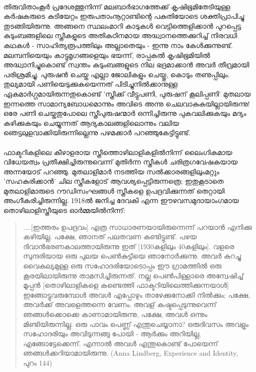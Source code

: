 \paragraph{}തിരുവിതാംകൂർ പ്രദേശത്തുനിന്ന് മലബാർഭാഗത്തേക്ക് കൃഷിഭൂമിതേടിയുള്ള കർഷകരുടെ കുടിയേറ്റം ഇരുപതാംനൂറ്റാണ്ടിന്റെ പകുതിയോടെ ശക്തിപ്രാപിച്ചു തുടങ്ങിയിരുന്നു. അങ്ങനെ സ്ഥലംമാറി കാടുകൾ വെട്ടിത്തെളിക്കാൻ പുറപ്പെട്ട കുടുംബങ്ങളിലെ സ്ത്രീകളുടെ അതികഠിനമായ അദ്ധ്വാനത്തെക്കുറിച്ച് നിരവധി കഥകൾ - സാഹിത്യരൂപത്തിലും അല്ലാതെയും - ഇന്നു നാം കേൾക്കുന്നുണ്ട്. മലമ്പനിയെയും കാട്ടുമൃഗങ്ങളെയും ഭയന്ന്, രാപ്പകൽ കൃഷിഭൂമിയിൽ അദ്ധ്വാനിച്ചുകൊണ്ട് സ്വന്തം കുടുംബങ്ങളുടെ നില ഭദ്രമാക്കാൻ അവർ തീവ്രമായി പരിശ്രമിച്ചു. പുരുഷൻ ചെയ്ത എല്ലാ ജോലികളും ചെയ്തു, കൊടും തണുപ്പിലും. തുല്യമായി പണിയെടുക്കുകയെന്നത് പിടിച്ചുനിൽക്കാനുള്ള ഏകമാർഗ്ഗമായിരുന്നതുകൊണ്ട് 'സ്ത്രീക്ക് വീട്ടുപണി, പുരുഷന് കൂലിപ്പണി' മുതലായ ഇന്നത്തെ സാമാന്യബോധമൊന്നും അവിടെ അന്നു ചെലവാകുകയില്ലായിരുന്നു! ഒരേ പണി ചെയ്തതുപോലെ സ്ത്രീപുരുഷന്മാർ ഒന്നിച്ചിരുന്നു പുകവലിക്കുകയും മദ്യം കഴിക്കുകയും ചെയ്യുന്നത് ആദ്യകാലങ്ങളിലൊന്നും വലിയ ഞെട്ടലുളവാക്കിയിരുന്നില്ലെന്നു പഴമക്കാർ പറഞ്ഞുകേട്ടിട്ടുണ്ട്.

\paragraph{}ഫാക്ടറികളിലെ കീഴാളരായ സ്ത്രീത്തൊഴിലാളികളിൽനിന്ന് ലൈംഗികമായ വിധേയത്വം പ്രതീക്ഷിച്ചിരുന്നുവെന്ന് മുതിർന്ന സ്ത്രീകൾ ചരിത്രഗവേഷകയായ അന്നയോട് പറഞ്ഞു. മുതലാളിമാർ നടത്തിയ സൽക്കാരങ്ങളിലുംമറ്റും 'സഹകരിക്കാൻ' ചില സ്ത്രീകളോട് ആവശ്യപ്പെട്ടിരുന്നത്രെ; ഇതുകൂടാതെ മുതലാളിമാരുടെ റൗഡിസംഘങ്ങൾ സ്ത്രീകളെ ഉപദ്രവിക്കുന്നത് തെറ്റായി അംഗീകരിച്ചിരുന്നില്ല. 1918ൽ ജനിച്ച ദേവകി എന്ന ഈഴവസമുദായാംഗമായ തൊഴിലാളിസ്ത്രീയുടെ ഓർമ്മയിൽനിന്ന്:
\begin{quotation}
....[ഇത്തരം ഉപദ്രവം] എത്ര സാധാരണയായിരുന്നെന്ന് പറയാൻ എനിക്കു കഴിയില്ല. പക്ഷേ, ഞാനത് പലതവണ കണ്ടിട്ടുണ്ട്. പഴയ ദിവാൻഭരണകാലത്തായിരുന്നു ഇത് [1930കളിലും 40കളിലും]. വളരെ സുന്ദരിയായ ഒരു പുലയ പെൺകുട്ടിയെ ഞാനോർക്കുന്നു. അവർ കുറച്ചു വൈകല്യമുള്ള ഒരു സഹോദരിയോടൊപ്പം ഈ ഗ്രാമത്തിൽ ഒരു കൂരയിലായിരുന്നു താമസിച്ചിരുന്നത്. നല്ല പെൺപിള്ളാരെ അന്വേഷിച്ച് മൂപ്പൻ [തൊഴിലാളികളെ കണ്ടെത്തി ഫാക്ടറിയിലെത്തിക്കുന്നയാൾ] ഇങ്ങോട്ടുവരുമ്പോൾ അവൾ എപ്പോഴും താഴേക്കുനോക്കി നിൽക്കും; പക്ഷേ, അവർക്ക് അവളെത്തന്നെ വേണം. അവള് കഷ്ടപ്പെടുന്നുവെന്ന് ഞങ്ങൾക്കൊക്കെ കാണാമായിരുന്നു, പക്ഷേ, അവൾ ഒന്നും മിണ്ടിയിരുന്നില്ല. ഒരു പാവം പെണ്ണ് എന്തുചെയ്യാനാ? ഒരുദിവസം അവളും സഹോദരിയും അവിടുന്നങ്ങു പോയി - ആർക്കും അറിയില്ല, എങ്ങോട്ടേക്കെന്ന്. എന്നാൽ അവൾ എന്തുകൊണ്ട് പോയെന്ന് ഞങ്ങൾക്കറിയാമായിരുന്നു.
(Anna Lindberg, Experience and Identity, പുറം 144)
\end{quotation}
